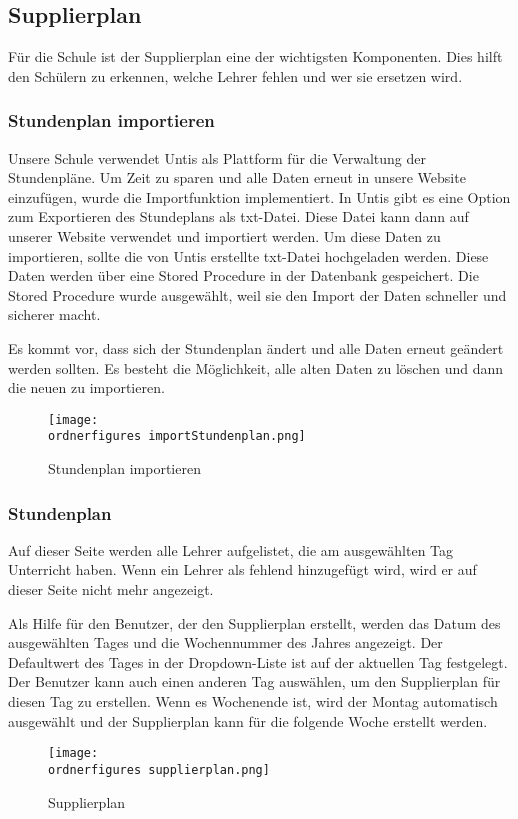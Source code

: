 \subsection{Supplierplan}
Für die Schule ist der Supplierplan eine der wichtigsten Komponenten. Dies hilft den Schülern zu erkennen, welche Lehrer fehlen und wer sie ersetzen wird.

\subsubsection{Stundenplan importieren}
Unsere Schule verwendet Untis als Plattform für die Verwaltung der Stundenpl\"ane. Um Zeit zu sparen und alle Daten erneut in unsere Website einzufügen, wurde die Importfunktion implementiert. In Untis gibt es eine Option zum Exportieren des Stundeplans als txt-Datei. Diese Datei kann dann auf unserer Website verwendet und importiert werden.
Um diese Daten zu importieren, sollte die von Untis erstellte txt-Datei hochgeladen werden. Diese Daten werden über eine Stored Procedure in der Datenbank gespeichert. Die Stored Procedure wurde ausgewählt, weil sie den Import der Daten schneller und sicherer macht.

Es kommt vor, dass sich der Stundenplan ändert und alle Daten erneut geändert werden sollten. Es besteht die Möglichkeit, alle alten Daten zu löschen und dann die neuen zu importieren.
\begin{figure}[H]
	\centering
	\texttt{[image: \\ordnerfigures importStundenplan.png]}
	\caption{Stundenplan importieren}
	\label{fi:import}
\end{figure}

\subsubsection{Stundenplan }

Auf dieser Seite werden alle Lehrer aufgelistet, die am ausgewählten Tag Unterricht haben. Wenn ein Lehrer als fehlend hinzugefügt wird, wird er auf dieser Seite nicht mehr angezeigt.

Als Hilfe für den Benutzer, der den Supplierplan erstellt, werden das Datum des ausgewählten Tages und die Wochennummer des Jahres angezeigt.
Der Defaultwert des Tages in der Dropdown-Liste ist auf der aktuellen Tag festgelegt. Der Benutzer kann auch einen anderen Tag auswählen, um den Supplierplan für diesen Tag zu erstellen. Wenn es Wochenende ist, wird der Montag automatisch ausgewählt und der Supplierplan kann für die folgende Woche erstellt werden.
\begin{figure}[H]
	\centering
	\texttt{[image: \\ordnerfigures supplierplan.png]}
	\caption{Supplierplan}
	\label{fi:supplierplan}
\end{figure}

